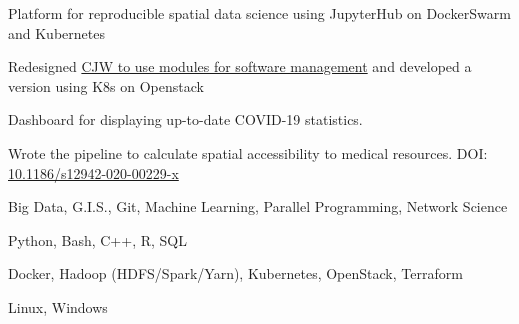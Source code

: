 \documentclass{acmresume}
\begin{document}
        \begin{titemize}
        \end{titemize}\vspace*{0.25cm}
		
        \begin{titemize}
        \end{titemize}\vspace*{0.25cm}
    
    
    
    \vspace{-0.5cm}
    
    \begin{titemize}
    	\item Platform for reproducible spatial data science using JupyterHub on DockerSwarm and Kubernetes
    	\item Redesigned \href{https://www.hydroshare.org/resource/4cfd280e8eb747169b293aec2862d4f5/}{CJW to use modules for software management} and developed a version using K8s on Openstack
    \end{titemize}
    
    \begin{titemize}
    	\item Dashboard for displaying up-to-date COVID-19 statistics.
    	\item Wrote the pipeline to calculate spatial accessibility to medical resources. DOI: \href{https://doi.org/10.1186/s12942-020-00229-x}{10.1186/s12942-020-00229-x}
    \end{titemize}
    
    
    
    
    \vspace*{-0.5cm}
        \begin{description}[topsep=0pt,itemsep=0pt]
        	 Big Data, G.I.S., Git, Machine Learning, Parallel Programming, Network Science
        	
        	 Python, Bash, C++, R, SQL
        	
        	 Docker, Hadoop (HDFS/Spark/Yarn), Kubernetes, OpenStack, Terraform
        	
        	 Linux, Windows
        \end{description}

	
\end{document}
